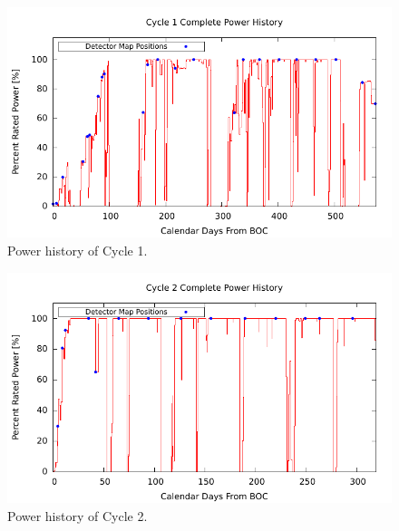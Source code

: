 \begin{landscape}
\begin{figure}[htb]
  \centering
  \includegraphics[scale=1.8]{expdata/figs/cycle1.pdf}
  \caption{Power history of Cycle 1.
  \label{fig:power_historyc1}}
\end{figure}
\end{landscape}
\clearpage
\begin{landscape}
\begin{figure}[htb]
  \centering
  \includegraphics[scale=1.8]{expdata/figs/cycle2.pdf}
  \caption{Power history of Cycle 2.
  \label{fig:power_historyc2}}
\end{figure}
\end{landscape}

